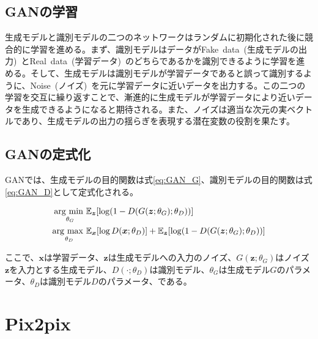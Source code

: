 \subsection{GANの学習}

生成モデルと識別モデルの二つのネットワークはランダムに初期化された後に競合的に学習を進める。まず、識別モデルはデータがFake~data~(生成モデルの出力)~とReal~data~(学習データ)~のどちらであるかを識別できるように学習を進める。そして、生成モデルは識別モデルが学習データであると誤って識別するように、Noise~(ノイズ)~を元に学習データに近いデータを出力する。この二つの学習を交互に繰り返すことで、漸進的に生成モデルが学習データにより近いデータを生成できるようになると期待される。また、ノイズは適当な次元の実ベクトルであり、生成モデルの出力の揺らぎを表現する潜在変数の役割を果たす。

\subsection{GANの定式化}

GANでは、生成モデルの目的関数は式\ref{eq:GAN_G}、識別モデルの目的関数は式\ref{eq:GAN_D}として定式化される。

\begin{align}
    \label{eq:GAN_G}
    \mathop{\rm arg~min~}\limits _{\theta_G}& \mathbb{E}_{\boldsymbol{z}}[\log (1-D(G(\boldsymbol{z};\theta_G);\theta_D))]\\
    \label{eq:GAN_D}
    \mathop{\rm arg~max~}\limits _{\theta_D}& \mathbb{E}_{\boldsymbol{x}}[\log D(\boldsymbol{x};\theta_D)]+\mathbb{E}_{\boldsymbol{z}}[\log (1-D(G(\boldsymbol{z};\theta_G);\theta_D))]
\end{align}


ここで、$\boldsymbol{x}$は学習データ、$\boldsymbol{z}$は生成モデルへの入力のノイズ、$G(\boldsymbol{z};\theta_G)$はノイズ$\boldsymbol{z}$を入力とする生成モデル、$D(\cdot;\theta_D)$は識別モデル、$\theta_G$は生成モデル$G$のパラメータ、$\theta_D$は識別モデル$D$のパラメータ、である。

\section{Pix2pix}

